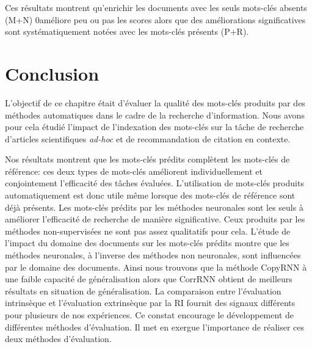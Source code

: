 Ces résultats montrent qu'enrichir les documents avec les seuls mots-clés absents (M+N) 0améliore peu ou pas les scores alors que des améliorations significatives sont systématiquement notées avec les mots-clés présents (P+R).

\vspace{-0.5cm}

\section{Conclusion}

L'objectif de ce chapitre était d'évaluer la qualité des mots-clés produits par des méthodes automatiques dans le cadre de la recherche d'information. 
Nous avons pour cela étudié l'impact de l'indexation des mots-clés sur la tâche de recherche d'articles scientifiques \textit{ad-hoc} et de recommandation de citation en contexte.


Nos résultats montrent que les mots-clés prédits complètent les mots-clés de référence: ces deux types de mots-clés améliorent individuellement et conjointement l'efficacité des tâches évaluées.
L'utilisation de mots-clés produits automatiquement est donc utile même lorsque des mots-clés de référence sont déjà présents.
Les mots-clés prédits par les méthodes neuronales sont les seuls à améliorer l'efficacité de recherche de manière significative.
Ceux produits par les méthodes non-supervisées ne sont pas assez qualitatifs pour cela.
L'étude de l'impact du domaine des documents sur les mots-clés prédits montre que les méthodes neuronales, à l'inverse des méthodes non neuronales, sont influencées par le domaine des documents.
Ainsi nous trouvons que la méthode CopyRNN à une faible capacité de généralisation alors que CorrRNN obtient de meilleurs résultats en situation de généralisation.
La comparaison entre l'évaluation intrinsèque et l'évaluation extrinsèque par la RI fournit des signaux différents pour plusieurs de nos expériences. Ce constat encourage le développement de différentes méthodes d'évaluation. Il met en exergue l'importance de réaliser ces deux méthodes d'évaluation.


